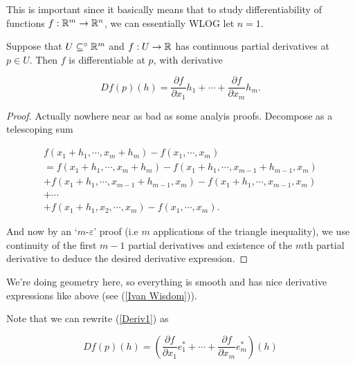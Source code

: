 \documentclass[11pt]{scrartcl}
\begin{document}
This is important since it basically means that to study differentiability of functions $f : \mathbb R^m \rightarrow \mathbb R^n$, we can essentially WLOG let $n=1$.

\begin{theorem}
    Suppose that $U \subseteq^\circ \mathbb R^m$ and $f : U \rightarrow \mathbb R$ has continuous partial derivatives at $p \in U$. Then $f$ is differentiable at $p$, with derivative
    
    \begin{equation}
        Df(p)(h) = \frac{\partial f}{\partial x_1}h_1 + \cdots + \frac{\partial f}{\partial x_m}h_m.
        \label{Deriv1}
    \end{equation}

    \begin{proof}
        Actually nowhere near as bad as some analyis proofs. Decompose as a telescoping sum

        \begin{align}
        f(x_1 + h_1, \cdots , x_m + h_m) - f(x_1, \cdots , x_m) \\ 
        = f(x_1 + h_1, \cdots , x_m + h_m) - f(x_1 + h_1, \cdots , x_{m-1} + h_{m-1} , x_m) \\
        + f(x_1 + h_1, \cdots , x_{m-1} + h_{m-1}, x_m) - f(x_1 + h_1, \cdots , x_{m-1}, x_m) \\
        + \cdots \\
        + f(x_1 + h_1, x_2, \cdots , x_m) - f(x_1, \cdots , x_m).
        \end{align}

        And now by an `$m$-$\varepsilon$' proof (i.e $m$ applications of the triangle inequality), we use continuity of the first $m-1$ partial derivatives and existence of the $m$th partial derivative to deduce the desired derivative expression.
    \end{proof}
\label{extracting derivatives}
\end{theorem}

We're doing geometry here, so everything is smooth and has nice derivative expressions like above (see (\ref{Ivan Wisdom})).

Note that we can rewrite (\ref{Deriv1}) as 

\begin{equation}
    Df(p)(h) = \left( \frac{\partial f}{\partial x_1} e_1^* + \cdots + \frac{\partial f}{\partial x_m} e_m^* \right)(h)
\end{equation}
\end{document}
